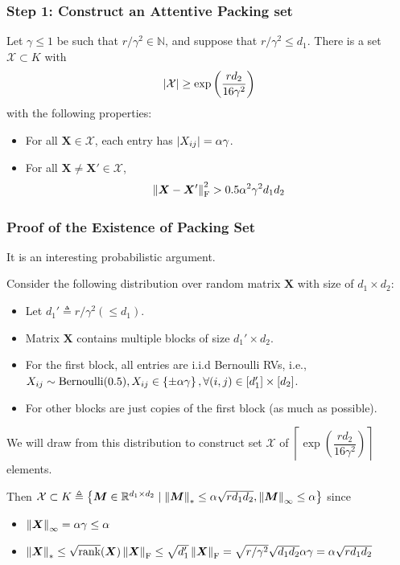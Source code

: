 \documentclass[10pt,xcolor={usenames,dvipsnames,table},aspectratio=169]{beamer}
\begin{document}
\begin{frame}
    \frametitle{Step 1: Construct an Attentive Packing set}
    \begin{lemma}
        Let $\gamma \leq 1$ be such that $r/\gamma^2 \in \mathbb{N}$, and suppose that $r/\gamma^2 \leq d_1$. There is a set $\mathcal{X} \subset K$ with  
        \[
        \left\lvert\mathcal{X}\right\rvert \geq \exp \left( \dfrac{rd_2}{16 \gamma^2} \right)
        \] 
        with the following properties:
        \begin{itemize}
            \item For all $\bm{X} \in \mathcal{X}$, each entry has $\left\lvert X_{ij}\right\rvert = \alpha \gamma$.
            \item For all $\bm{X} \neq \bm{X}' \in \mathcal{X}$,
                \[
                \left\lVert\bm{X} - \bm{X}'\right\rVert_{\rm F}^2 > 0.5 \alpha^2 \gamma^2 d_1 d_2
                \] 
        \end{itemize}
    \end{lemma}
\end{frame}
\begin{frame}
    \frametitle{Proof of the Existence of Packing Set}
    {\blue It is an interesting probabilistic argument.}
    
    Consider the following distribution over random matrix $\bm{X}$ with size of $d_1 \times d_2$:
     \begin{itemize}
        \item Let $d_1' \triangleq r/\gamma^2 (\leq d_1)$. 
        \item Matrix $\bm{X}$ contains multiple blocks of size $d_1' \times d_2$.
        \item For the first block, all entries are i.i.d Bernoulli RVs, i.e.,  $X_{ij} \sim \text{Bernoulli}(0.5), X_{ij} \in \left\{\pm \alpha \gamma\right\}, \forall (i,j) \in [d_1'] \times [d_2]$.
        \item For other blocks are just copies of the first block (as much as possible).
    \end{itemize}
    We will draw from this distribution to construct set $\mathcal{X}$ of $\left\lceil \exp \left( \dfrac{rd_2}{16 \gamma^2} \right)\right\rceil $ elements.


    Then $\mathcal{X} \subset K \triangleq \left\{\bm{M}  \in  \mathbb{R}^{d_1 \times d_2} \mid \left\lVert\bm{M}\right\rVert_{*} \leq \alpha \sqrt{r d_1 d_2}, \left\lVert\bm{M}\right\rVert_{\infty} \leq \alpha \right\}$ since
    \begin{itemize}
        \item $\left\lVert\bm{X}\right\rVert_{\infty} = \alpha \gamma \leq \alpha$
        \item $\left\lVert\bm{X}\right\rVert_{*} \leq \sqrt{\text{rank}}(\bm{X}) \left\lVert\bm{X}\right\rVert_{\rm F} \leq \sqrt{d_1'} \left\lVert\bm{X}\right\rVert_{\rm F} = \sqrt{r/\gamma^2} \sqrt{d_1d_2} \alpha \gamma = \alpha \sqrt{r d_1d_2 }$ 
    \end{itemize}

\end{frame}
\end{document}
